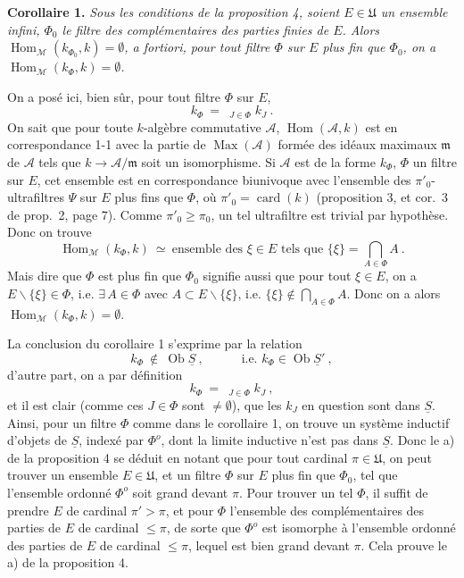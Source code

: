 \documentclass[11pt]{article}
\newcommand{\printedpage}[1]{\marginpar{\footnotesize p.~#1}}
\newcommand{\msp}[1]{\marginpar{\footnotesize [#1]}}
\newcommand{\limind}{\mathop{\underrightarrow{\mathrm{lim}}}}
\begin{document}
\textbf{Corollaire 1.} \textit{Sous les conditions de la proposition 4, soient $E\in\mathfrak{U}$ un ensemble infini, $\Phi_0$ le filtre des complémentaires des parties finies de $E$. Alors $\operatorname{Hom}_{\mathcal{M}}(k_{\Phi_0},k)=\emptyset$, a fortiori, pour tout filtre $\Phi$ sur $E$ plus fin que $\Phi_0$, on a $\operatorname{Hom}_{\mathcal{M}}(k_\Phi,k)=\emptyset$.}

\msp{page 15}
On a posé ici, bien sûr, pour tout filtre $\Phi$ sur $E$,
\[
k_\Phi\ =\ \limind_{J\in\Phi}k_J\ .
\]
On sait que pour toute $k$-algèbre commutative $\mathcal{A}$, $\operatorname{Hom}(\mathcal{A},k)$ est en correspondance 1-1 avec la partie de $\operatorname{Max}(\mathcal{A})$ formée des idéaux maximaux $\mathfrak{m}$ de $\mathcal{A}$ tels que $k\longrightarrow\mathcal{A}/\mathfrak{m}$ soit un isomorphisme. Si $\mathcal{A}$ est de la forme $k_\Phi$, $\Phi$ un filtre sur $E$, cet ensemble est en correspondance biunivoque avec l'ensemble des $\pi'_0$-ultrafiltres $\Psi$ sur $E$ plus fins que $\Phi$, où $\pi'_0=\operatorname{card}(k)$ (proposition 3, et cor.~3 de prop.~2, page 7). Comme $\pi'_0\geqslant\pi_0$, un tel ultrafiltre est trivial par hypothèse. Donc on trouve
\[
\operatorname{Hom}_{\mathcal{M}}(k_\Phi,k)\ \simeq\ \text{ensemble des } \xi\in E \text{ tels que } \{\xi\}=\textstyle\bigcap_{A\in\Phi}A\ . \tag*{$(*)$}
\]
Mais dire que $\Phi$ est plus fin que $\Phi_0$ signifie aussi que pour tout $\xi\in E$, on a $E\backslash\{\xi\}\in\Phi$, i.e. $\exists\,A\in\Phi$ avec $A\subset E\backslash\{\xi\}$, i.e. $\{\xi\}\notin\bigcap_{A\in\Phi}A$. Donc on a alors $\operatorname{Hom}_{\mathcal{M}}(k_\Phi,k)=\emptyset$.

La conclusion du corollaire 1 s'exprime par la relation
\[
k_\Phi\ \notin\ \operatorname{Ob}\underline{S}\ ,\qquad\quad \text{i.e. } k_\Phi\in\operatorname{Ob}\underline{S}'\ ,
\]
d'autre part, on a par définition
\[
k_\Phi\ =\ \limind_{J\in\Phi}k_J\ ,
\]
\msp{page 16}
et il est clair (comme ces $J\in\Phi$ sont $\neq\emptyset$), que les $k_J$ en question sont dans $\underline{S}$. Ainsi, pour un filtre $\Phi$ comme dans le corollaire 1, on trouve un système inductif d'objets de $\underline{S}$, indexé par $\Phi^o$, dont la limite inductive n'est pas dans $\underline{S}$. Donc le a) de la proposition 4 se déduit en notant que pour tout cardinal $\pi\in\mathfrak{U}$, on peut trouver un ensemble $E\in\mathfrak{U}$, et un filtre $\Phi$ sur $E$ plus fin que $\Phi_0$, tel que l'ensemble ordonné $\Phi^o$ soit grand devant $\pi$. Pour trouver un tel $\Phi$, il suffit de prendre $E$ de cardinal $\pi'>\pi$, et pour $\Phi$ l'ensemble
\printedpage{198}
des complémentaires des parties de $E$ de cardinal $\leqslant\pi$, de sorte que $\Phi^o$ est isomorphe à l'ensemble ordonné des parties de $E$ de cardinal $\leqslant\pi$, lequel est bien grand devant $\pi$. Cela prouve le a) de la proposition 4.
\end{document}
